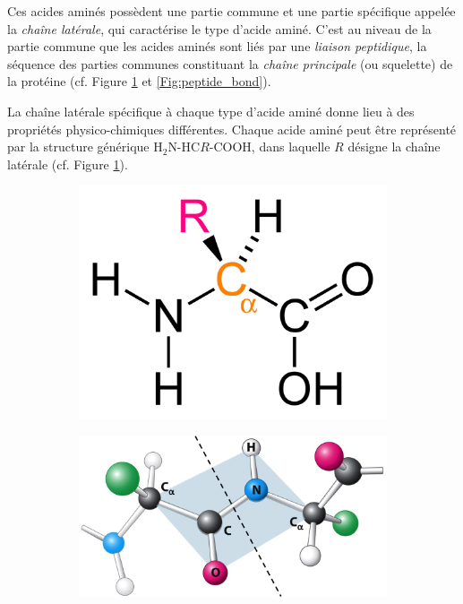 Ces acides aminés possèdent une partie commune et une partie spécifique appelée la \textit{chaîne latérale}, qui caractérise le type d'acide aminé. C'est au niveau de la partie commune que les acides aminés sont liés par une \textit{liaison peptidique}, la séquence des parties communes constituant la \textit{chaîne principale} (ou squelette) de la protéine (cf. Figure \ref{Fig:amino_acid_structure} et \ref{Fig:peptide_bond}). 

La chaîne latérale spécifique à chaque type d'acide aminé donne lieu à des propriétés physico-chimiques différentes. Chaque acide aminé peut être représenté par la structure générique H$_{2}$N-HC$R$-COOH, dans laquelle $R$ désigne la chaîne latérale (cf. Figure \ref{Fig:amino_acid_structure}).

\begin{figure}
  \begin{subfigure}{.4\textwidth}
  \centering
  {\includegraphics[width=0.8\linewidth]{./figures/ch1/amino_acid_structure}}
    \caption{}
    \label{Fig:amino_acid_structure}
  \end{subfigure}
  \begin{subfigure}{.6\textwidth}
  \centering
  {\includegraphics[width=0.8\linewidth]{./figures/ch1/peptidic_bond.png}}

\end{subfigure}
\end{figure}

